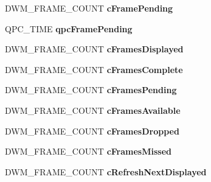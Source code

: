 \begin{DoxyCompactItemize}
D\+W\+M\+\_\+\+F\+R\+A\+M\+E\+\_\+\+C\+O\+U\+NT {\bfseries c\+Frame\+Pending}
\item 
\mbox{\label{struct___d_w_m___t_i_m_i_n_g___i_n_f_o_a339207a32f5b57ca082e6a17c24bba53}} 
Q\+P\+C\+\_\+\+T\+I\+ME {\bfseries qpc\+Frame\+Pending}
\item 
\mbox{\label{struct___d_w_m___t_i_m_i_n_g___i_n_f_o_a36ac863be93b5938b0c242c942551160}} 
D\+W\+M\+\_\+\+F\+R\+A\+M\+E\+\_\+\+C\+O\+U\+NT {\bfseries c\+Frames\+Displayed}
\item 
\mbox{\label{struct___d_w_m___t_i_m_i_n_g___i_n_f_o_a05df1fef8b4509457fb38f9c479673b1}} 
D\+W\+M\+\_\+\+F\+R\+A\+M\+E\+\_\+\+C\+O\+U\+NT {\bfseries c\+Frames\+Complete}
\item 
\mbox{\label{struct___d_w_m___t_i_m_i_n_g___i_n_f_o_a6691cf6f217fe69a71b29072f32a542d}} 
D\+W\+M\+\_\+\+F\+R\+A\+M\+E\+\_\+\+C\+O\+U\+NT {\bfseries c\+Frames\+Pending}
\item 
\mbox{\label{struct___d_w_m___t_i_m_i_n_g___i_n_f_o_a425f7d400e275806387332305c38662a}} 
D\+W\+M\+\_\+\+F\+R\+A\+M\+E\+\_\+\+C\+O\+U\+NT {\bfseries c\+Frames\+Available}
\item 
\mbox{\label{struct___d_w_m___t_i_m_i_n_g___i_n_f_o_ac324c46c1f006d324c607388780cb115}} 
D\+W\+M\+\_\+\+F\+R\+A\+M\+E\+\_\+\+C\+O\+U\+NT {\bfseries c\+Frames\+Dropped}
\item 
\mbox{\label{struct___d_w_m___t_i_m_i_n_g___i_n_f_o_afcc7f3ca9e9e276fc90b229f53e0e7b3}} 
D\+W\+M\+\_\+\+F\+R\+A\+M\+E\+\_\+\+C\+O\+U\+NT {\bfseries c\+Frames\+Missed}
\item 
\mbox{\label{struct___d_w_m___t_i_m_i_n_g___i_n_f_o_a032bb6bb584f5ca68bd2900fa66eca97}} 
D\+W\+M\+\_\+\+F\+R\+A\+M\+E\+\_\+\+C\+O\+U\+NT {\bfseries c\+Refresh\+Next\+Displayed}
\item 
\mbox{\label{struct___d_w_m___t_i_m_i_n_g___i_n_f_o_a2b765c5788bb530ff03242683f73e1c3}} 

\end{DoxyCompactItemize}
